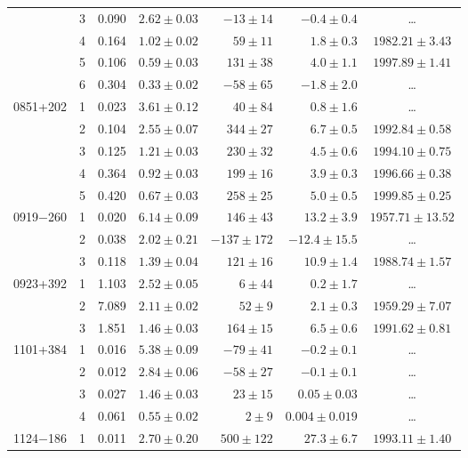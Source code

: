 \begin{table}[tbh!]
\begin{SingleSpace}
\begin{tabular}{l c r r r r c}
         &  3 &  0.090 & $ 2.62\pm 0.03$ & $ -13\pm  14$ & $ -0.4\pm 0.4$ & \dots \\
         &  4 &  0.164 & $ 1.02\pm 0.02$ & $  59\pm  11$ & $  1.8\pm 0.3$ & $1982.21\pm   3.43$ \\
         &  5 &  0.106 & $ 0.59\pm 0.03$ & $ 131\pm  38$ & $  4.0\pm 1.1$ & $1997.89\pm   1.41$ \\
         &  6 &  0.304 & $ 0.33\pm 0.02$ & $ -58\pm  65$ & $ -1.8\pm 2.0$ & \dots \\
0851+202 &  1 &  0.023 & $ 3.61\pm 0.12$ & $  40\pm  84$ & $  0.8\pm 1.6$ & \dots \\
         &  2 &  0.104 & $ 2.55\pm 0.07$ & $ 344\pm  27$ & $  6.7\pm 0.5$ & $1992.84\pm   0.58$ \\
         &  3 &  0.125 & $ 1.21\pm 0.03$ & $ 230\pm  32$ & $  4.5\pm 0.6$ & $1994.10\pm   0.75$ \\
         &  4 &  0.364 & $ 0.92\pm 0.03$ & $ 199\pm  16$ & $  3.9\pm 0.3$ & $1996.66\pm   0.38$ \\
         &  5 &  0.420 & $ 0.67\pm 0.03$ & $ 258\pm  25$ & $  5.0\pm 0.5$ & $1999.85\pm   0.25$ \\
0919$-$260 &  1 &  0.020 & $ 6.14\pm 0.09$ & $ 146\pm  43$ & $ 13.2\pm 3.9$ & $1957.71\pm  13.52$ \\
         &  2 &  0.038 & $ 2.02\pm 0.21$ & $-137\pm 172$ & $-12.4\pm15.5$ & \dots \\
         &  3 &  0.118 & $ 1.39\pm 0.04$ & $ 121\pm  16$ & $ 10.9\pm 1.4$ & $1988.74\pm   1.57$ \\
0923+392 &  1 &  1.103 & $ 2.52\pm 0.05$ & $   6\pm  44$ & $  0.2\pm 1.7$ & \dots \\
         &  2 &  7.089 & $ 2.11\pm 0.02$ & $  52\pm   9$ & $  2.1\pm 0.3$ & $1959.29\pm   7.07$ \\
         &  3 &  1.851 & $ 1.46\pm 0.03$ & $ 164\pm  15$ & $  6.5\pm 0.6$ & $1991.62\pm   0.81$ \\
1101+384 &  1 &  0.016 & $ 5.38\pm 0.09$ & $ -79\pm  41$ & $ -0.2\pm 0.1$ & \dots \\
         &  2 &  0.012 & $ 2.84\pm 0.06$ & $ -58\pm  27$ & $ -0.1\pm 0.1$ & \dots \\
         &  3 &  0.027 & $ 1.46\pm 0.03$ & $  23\pm  15$ & $  0.05\pm 0.03$ & \dots \\
         &  4 &  0.061 & $ 0.55\pm 0.02$ & $   2\pm   9$ & $  0.004\pm 0.019$ & \dots \\
1124$-$186 &  1 &  0.011 & $ 2.70\pm 0.20$ & $ 500\pm 122$ & $ 27.3\pm 6.7$ & $1993.11\pm   1.40$ \\

\end{tabular}
\end{SingleSpace}
\end{table}
